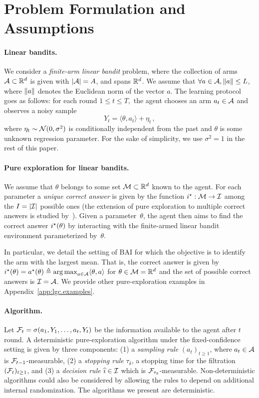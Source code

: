\section{Problem Formulation and Assumptions}\label{sec:lgc.formulation}

\paragraph{Linear bandits.}
We consider a \emph{finite-arm linear bandit} problem, where the collection of arms $\mathcal{A}\subset \mathbb{R}^d$ is given  with $|\mathcal{A}|=A$, and spans $\mathbb{R}^d$. We assume that $\forall a\in\mathcal{A}, \left\lVert a\right\rVert\leq L$, where $\left\lVert a\right\rVert$ denotes the Euclidean norm of the vector $a$. The learning protocol goes as follows: for each round $1\leq t \leq T,$ the agent chooses an arm $a_t\in\mathcal{A}$ and observes a noisy sample
\[
Y_t =\langle \theta,a_t\rangle +\eta_t\,,
\]
where $\eta_t \sim \mathcal{N}(0,\sigma^2)$ is conditionally independent from the past and $\theta$ is some unknown regression parameter. For the sake of simplicity, we use $\sigma^2 = 1$ in the rest of this paper.

\paragraph{Pure exploration for linear bandits.}
We assume that $\theta$ belongs to some set $\mathcal{M}\subset\mathbb{R}^d$ known to the agent. %
For each parameter a \emph{unique correct answer} is given by the function $i^\star: \mathcal{M} \to \mathcal{I}$ among the $I = |\mathcal{I}|$ possible ones (the extension of pure exploration to multiple correct answers is studied by~\citealt{degenne2019pure}). Given a parameter~$\theta$, the agent then aims to find the correct answer $i^\star(\theta)$ by interacting with the finite-armed linear bandit environment parameterized by~$\theta$.

In particular, we detail the setting of BAI for which the objective is to identify the arm with the largest mean. That is, the correct answer is given by $i^\star(\theta)=a^\star(\theta)\triangleq \operatorname*{arg\,max}_{a\in\mathcal{A}} \langle\theta,a\rangle$ for $\theta\in\mathcal{M} = \mathbb{R}^d$ and the set of possible correct answers is $\mathcal{I} = \mathcal{A}$. We provide other pure-exploration examples in Appendix~\ref{app:lgc.examples}.

\paragraph{Algorithm.}
Let $\mathcal{F}_{t}=\sigma (a_1,Y_1,\ldots, a_t,Y_t)$ be the information available to the agent after $t$ round. A deterministic pure-exploration algorithm under the fixed-confidence setting is given by three components: (1) a \emph{sampling rule} $(a_t)_{t\geq 1}$, where $a_t\in\mathcal{A}$ is $\mathcal{F}_{t-1}$-measurable, (2) a \emph{stopping rule} $\tau_\delta$, a stopping time for the filtration $(\mathcal{F}_t)_{t\geq 1}$, and (3) a \emph{decision rule} $\widehat{\imath}\in \mathcal{I}$ which is $\mathcal{F}_{\tau_\delta}$-measurable.
Non-deterministic algorithms could also be considered by allowing the rules to depend on additional internal randomization. The algorithms we present are deterministic.

